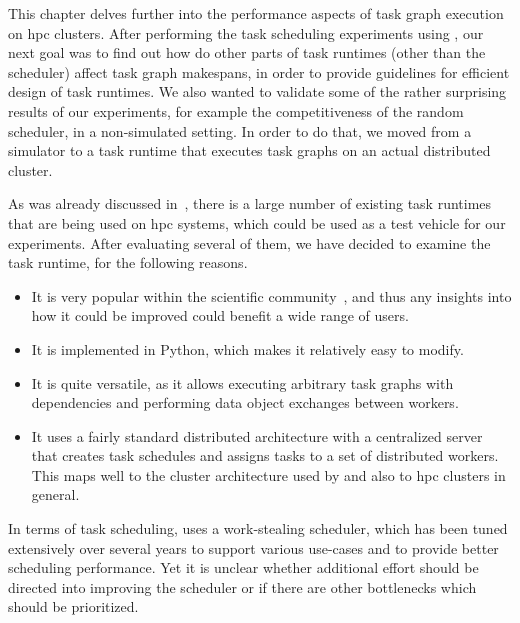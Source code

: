This chapter delves further into the performance aspects of task graph execution on
\gls{hpc} clusters. After performing the task scheduling experiments using
\estee{}, our next goal was to find out how do other parts of task runtimes
(other than the scheduler) affect task graph makespans, in order to provide guidelines for
efficient design of task runtimes. We also wanted to validate some of the rather surprising results
of our experiments, for example the competitiveness of the random scheduler, in a non-simulated
setting. In order to do that, we moved from a simulator to a task runtime that executes task graphs
on an actual distributed cluster.

As was already discussed in~, there is a large number of existing task
runtimes that are being used on \gls{hpc} systems, which could be used as a test
vehicle for our experiments. After evaluating several of them, we have decided to examine the
\dask{}~\cite{dask} task runtime, for the following reasons.
\begin{itemize}[itemsep=0pt]
	\item It is very popular within the scientific community~\cite{dask-user-survey}, and thus any insights
	      into how it could be improved could benefit a wide range of users.
	\item It is implemented in Python, which makes it relatively easy to modify.
	\item It is quite versatile, as it allows executing arbitrary task graphs with dependencies and
	      performing data object exchanges between workers.
	\item It uses a fairly standard distributed architecture with a centralized server that creates task
	      schedules and assigns tasks to a set of distributed workers. This maps well to the cluster
	      architecture used by \estee{} and also to \gls{hpc} clusters in
	      general.
\end{itemize}

In terms of task scheduling, \dask{} uses a work-stealing scheduler, which has
been tuned extensively over several years to support various use-cases and to provide better
scheduling performance. Yet it is unclear whether additional effort should be directed into
improving the scheduler or if there are other bottlenecks which should be prioritized.

